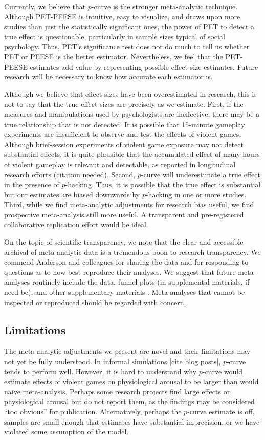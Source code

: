 \documentclass[man]{apa6}
\begin{document}
Currently, we believe that $p$-curve is the stronger meta-analytic technique. Although PET-PEESE is intuitive, easy to visualize, and draws upon more studies than just the statistically significant ones, the power of PET to detect a true effect is questionable, particularly in sample sizes typical of social psychology. Thus, PET's significance test does not do much to tell us whether PET or PEESE is the better estimator. Nevertheless, we feel that the PET-PEESE estimates add value by representing possible effect size estimates. Future research will be necessary to know how accurate each estimator is.

Although we believe that effect sizes have been overestimated in research, this is not to say that the true effect sizes are precisely as we estimate. First, if the measures and manipulations used by psychologists are ineffective, there may be a true relationship that is not detected. It is possible that 15-minute gameplay experiments are insufficient to observe and test the effects of violent games. Although brief-session experiments of violent game exposure may not detect substantial effects, it is quite plausible that the accumulated effect of many hours of violent gameplay is relevant and detectable, as reported in longitudinal research efforts (citation needed). Second, $p$-curve will underestimate a true effect in the presence of $p$-hacking. Thus, it is possible that the true effect is substantial but our estimates are biased downwards by $p$-hacking in one or more studies. Third, while we find meta-analytic adjustments for research bias useful, we find prospective meta-analysis still more useful. A transparent and pre-registered collaborative replication effort would be ideal.

On the topic of scientific transparency, we note that the clear and accessible archival of meta-analytic data is a tremendous boon to research transparency. We commend Anderson and colleagues for sharing the data and for responding to questions as to how best reproduce their analyses. We suggest that future meta-analyses routinely include the data, funnel plots (in supplemental materials, if need be), and other supplementary materials \citep{Lakens:etal:2015}. Meta-analyses that cannot be inspected or reproduced should be regarded with concern.

\subsection{Limitations}
The meta-analytic adjustments we present are novel and their limitations may not yet be fully understood. In informal simulations [cite blog posts], $p$-curve tends to perform well. However, it is hard to understand why $p$-curve would estimate effects of violent games on physiological arousal to be larger than would naive meta-analysis. Perhaps some research projects find large effects on physiological arousal but do not report them, as the findings may be considered ``too obvious'' for publication. Alternatively, perhaps the $p$-curve estimate is off, samples are small enough that estimates have substantial imprecision, or we have violated some assumption of the model.
\end{document}

